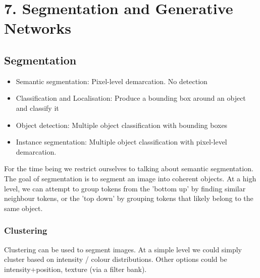 \documentclass[]{article}
\begin{document}
\section{7. Segmentation and Generative Networks}
	\subsection{Segmentation}
		\begin{itemize}
			\item Semantic segmentation: Pixel-level demarcation. No detection
			\item Classification and Localisation: Produce a bounding box around an object and classify it
			\item Object detection: Multiple object classification with bounding boxes
			\item Instance segmentation: Multiple object classification with pixel-level demarcation.
		\end{itemize}
		For the time being we restrict ourselves to talking about semantic segmentation.
		The goal of segmentation is to segment an image into coherent objects. At a high level, we can attempt to group tokens from the 'bottom up' by finding similar neighbour tokens, or the 'top down' by grouping tokens that likely belong to the same object.
	
		\subsubsection{Clustering}
			Clustering can be used to segment images. At a simple level we could simply cluster based on intensity / colour distributions. Other options could be intensity+position, texture (via a filter bank). 
			
\end{document}
